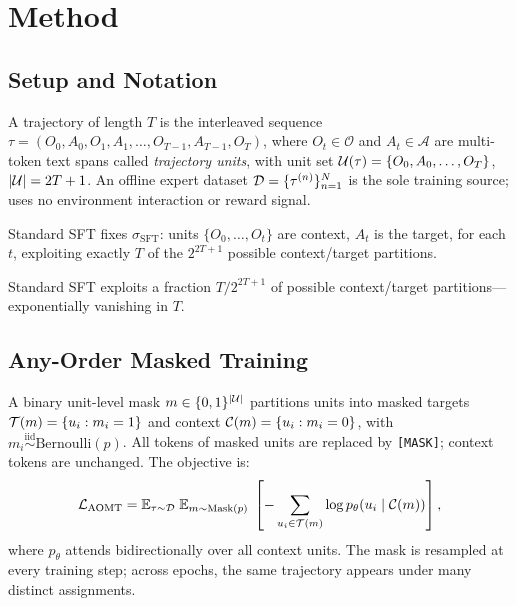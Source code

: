 \section{Method}
\label{sec:method}

\subsection{Setup and Notation}

A trajectory of length $T$ is the interleaved sequence
$\tau = (O_0, A_0, O_1, A_1, \ldots, O_{T-1}, A_{T-1}, O_T)$,
where $O_t \in \mathcal{O}$ and $A_t \in \mathcal{A}$ are multi-token text
spans called \emph{trajectory units}, with unit set
$\mathcal{U}(\tau) = \{O_0, A_0, \ldots, O_T\}$, $|\mathcal{U}| = 2T+1$.
An offline expert dataset $\mathcal{D} = \{\tau^{(n)}\}_{n=1}^N$ is the sole training
source; \aomt{} uses no environment interaction or reward signal.

Standard SFT fixes $\sigma_\text{SFT}$: units $\{O_0,\ldots,O_t\}$ are context,
$A_t$ is the target, for each $t$, exploiting exactly $T$ of the $2^{2T+1}$
possible context/target partitions.

\begin{remark}
\label{rem:fraction}
Standard SFT exploits a fraction $T/2^{2T+1}$ of possible context/target
partitions---exponentially vanishing in $T$.
\end{remark}

\subsection{Any-Order Masked Training}
\label{sec:aomt_core}

A binary unit-level mask $m \in \{0,1\}^{|\mathcal{U}|}$ partitions units into masked
targets $\mathcal{T}(m) = \{u_i : m_i = 1\}$ and context $\mathcal{C}(m) = \{u_i : m_i = 0\}$,
with $m_i \stackrel{\text{iid}}{\sim} \mathrm{Bernoulli}(p)$.
All tokens of masked units are replaced by \texttt{[MASK]}; context tokens are
unchanged. The \aomt{} objective is:
\begin{equation}
  \mathcal{L}_{\text{AOMT}} =
    \mathbb{E}_{\tau \sim \mathcal{D}}\;
    \mathbb{E}_{m \sim \mathrm{Mask}(p)}\;
    \left[
      -\sum_{u_i \in \mathcal{T}(m)} \log p_\theta\!\left(u_i \mid \mathcal{C}(m)\right)
    \right],
  \label{eq:aomt}
\end{equation}
where $p_\theta$ attends bidirectionally over all context units.
The mask is resampled at every training step; across epochs, the same trajectory
appears under many distinct assignments.

